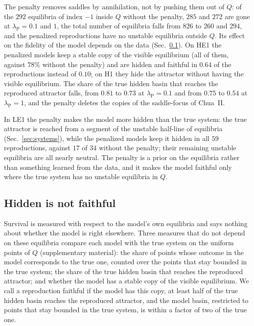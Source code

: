 \documentclass[aip,cha,reprint,amsmath,amssymb,longbibliography]{revtex4-2}
\theoremstyle{definition}
\begin{document}
The penalty removes saddles by annihilation, not by pushing them out of $Q$: of the $292$ equilibria of index $-1$ inside
$Q$ without the penalty, $285$ and $272$ are gone at $\lambda_{\mathrm{P}}=0.1$ and $1$, the total number of equilibria falls
from $826$ to $260$ and $294$, and the penalized reproductions have no unstable equilibria outside $Q$. Its effect on the
fidelity of the model depends on the data (Sec.~\ref{sec:fidelity}). On HE1 the penalized models keep a stable copy of the
visible equilibrium (all of them, against $78\%$ without the penalty) and are hidden and faithful in $0.64$ of the
reproductions instead of $0.10$; on H1 they hide the attractor without having the visible equilibrium. The share of the true
hidden basin that reaches the reproduced attractor falls, from $0.81$ to $0.73$ at $\lambda_{\mathrm{P}}=0.1$ and from
$0.75$ to $0.54$ at $\lambda_{\mathrm{P}}=1$, and the penalty deletes the copies of the saddle-focus of Chua~II.

In LE1 the penalty makes the model more hidden than the true system: the true attractor is reached from a segment of the
unstable half-line of equilibria (Sec.~\ref{sec:systems}), while the penalized models keep it hidden in all $59$
reproductions, against $17$ of $34$ without the penalty; their remaining unstable equilibria are all nearly neutral. The
penalty is a prior on the equilibria rather than something learned from the data, and it makes the model faithful only
where the true system has no unstable equilibria in $Q$.

\subsection{Hidden is not faithful}
\label{sec:fidelity}

Survival is measured with respect to the model's own equilibria and says nothing about whether the model is right
elsewhere. Three measures that do not depend on these equilibria compare each model with the true system on the uniform
points of $Q$ (supplementary material): the share of points whose outcome in the model corresponds to the true one,
counted over the points that stay bounded in the true system; the share of the true hidden basin that reaches the
reproduced attractor; and whether the model has a stable copy of the visible equilibrium. We call a reproduction faithful
if the model has this copy, at least half of the true hidden basin reaches the reproduced attractor, and the model basin,
restricted to points that stay bounded in the true system, is within a factor of two of the true one.
\end{document}
